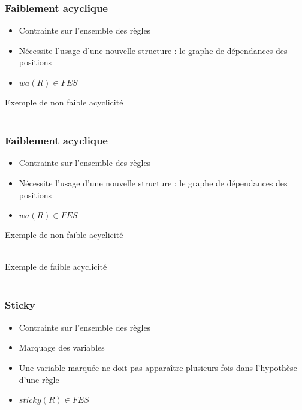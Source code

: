\begin{frame}
	\frametitle{Faiblement acyclique}
	\begin{itemize}
		\item Contrainte sur l'ensemble des règles
		\item Nécessite l'usage d'une nouvelle structure : le graphe de dépendances des
		positions
		\item $wa(R) \in FES$
	\end{itemize}
	\begin{exampleblock}{Exemple de non faible acyclicité}
		 \\
		 \\
	\end{exampleblock}
\end{frame}

\begin{frame}
	\frametitle{Faiblement acyclique}
	\begin{itemize}
		\item Contrainte sur l'ensemble des règles
		\item Nécessite l'usage d'une nouvelle structure : le graphe de dépendances des
		positions
		\item $wa(R) \in FES$
	\end{itemize}
	\begin{exampleblock}{Exemple de non faible acyclicité}
		 \\
		 \\
	\end{exampleblock}
	\begin{exampleblock}{Exemple de faible acyclicité}
		 \\
		 \\
	\end{exampleblock}
\end{frame}

\begin{frame}
	\frametitle{Sticky}
	\begin{itemize}
		\item Contrainte sur l'ensemble des règles
		\item Marquage des variables
		\item Une variable marquée ne doit pas apparaître plusieurs fois dans l'hypothèse
		d'une règle
		\item $sticky(R) \in FES$
	\end{itemize}
	\vspace{10mm}
\end{frame}

